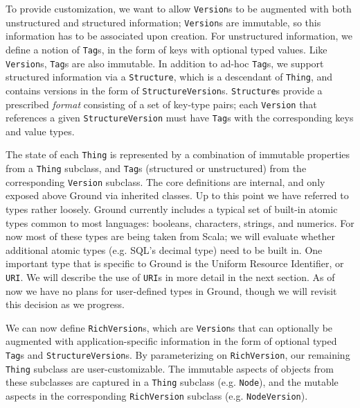 \documentclass{article}
\newenvironment{tldr}[1][r]
  {\wrapfigure{#1}{0.33\textwidth}\tcolorbox}
  {\endtcolorbox\endwrapfigure}
\newcommand{\core}{core\xspace}
\newcommand{\version}{\texttt{Version}\xspace}
\newcommand{\richversion}{\texttt{RichVersion}\xspace}
\newcommand{\thing}{\texttt{Thing}\xspace}
\newcommand{\node}{\texttt{Node}\xspace}
\newcommand{\structure}{\texttt{Structure}\xspace}
\newcommand{\tag}{\texttt{Tag}\xspace}
\newcommand{\uri}{\texttt{URI}\xspace}
\newcommand{\jmh}[1]{{\textcolor{red}{#1---jmh}}}
\begin{document}
To provide customization, we want to allow {\version}s to be augmented
with both unstructured and structured information; {\version}s are
immutable, so this information has to be associated upon creation. For unstructured information, 
we define a notion of {\tag}s, in the 
form of keys with optional typed values.  Like {\version}s, {\tag}s are also immutable.
In addition to ad-hoc {\tag}s,
we support structured information via a \structure, which is a descendant of \thing, and contains versions 
in the form of \texttt{StructureVersion}s. {\structure}s provide a prescribed \emph{format}
consisting of a set of key-type pairs; each \version that references a given \texttt{StructureVersion} 
must have {\tag}s with the corresponding 
keys and value types.


\begin{tldr}
The state of each \thing is represented by a combination of immutable properties from a \thing subclass, and {\tag}s (structured or unstructured) from the corresponding \version subclass.
The \core definitions are internal, and only exposed above Ground via inherited classes.
\end{tldr}
Up to this point we have referred to types rather loosely.  Ground currently includes 
a typical set of built-in atomic types common to most languages: booleans, characters, strings, and
numerics.  For now most of these types are being taken from Scala; we will evaluate whether additional 
atomic types (e.g. SQL's decimal type) need to be built in.  One important type that is specific to 
Ground is the Uniform Resource Identifier, or \uri.  We will describe the use of {\uri}s in more detail in the next section.  As of now we have no plans for user-defined types in Ground, though we will revisit
this decision as we progress.

We can now define {\richversion}s, which are {\version}s that can optionally be augmented with application-specific information in the form 
of optional typed {\tag}s and \texttt{StructureVersion}s.  By parameterizing on \richversion, our remaining \thing subclass are user-customizable.  The immutable aspects of objects from these subclasses are captured in a \thing subclass
(e.g. \node), and the mutable aspects in the corresponding \richversion subclass (e.g.
\texttt{NodeVersion}).  
\end{document}
